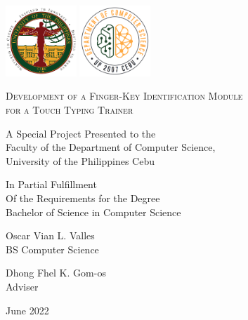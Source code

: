 \documentclass{report}
\begin{document}
\begin{titlepage}
	\centering

	\hspace{0pt}
	\vfill

	\includegraphics[width=0.2\textwidth]{upc.png}
	\includegraphics[width=0.2\textwidth]{dcs.png}
	\par\vspace{1cm}

	\textsc{Development of a Finger-Key Identification Module\\for a Touch Typing Trainer}
	\par\vspace{0.5cm}

	\hrulefill{}
	\par\vspace{0.25cm}
	A Special Project Presented to the\\
	Faculty of the Department of Computer Science,\\
	University of the Philippines Cebu

	\par\vspace{0.25cm}
	In Partial Fulfillment\\
	Of the Requirements for the Degree\\
	Bachelor of Science in Computer Science\\
	\par\vspace{0.25cm}
	\hrulefill{}
	\par\vspace{0.5cm}

	Oscar Vian L. Valles\\
	BS Computer Science
	\par\vspace{0.5cm}

	Dhong Fhel K. Gom-os\\
	Adviser
	\par\vspace{0.5cm}

	June 2022
	\vfill
	\hspace{0pt}
\end{titlepage}
\end{document}
